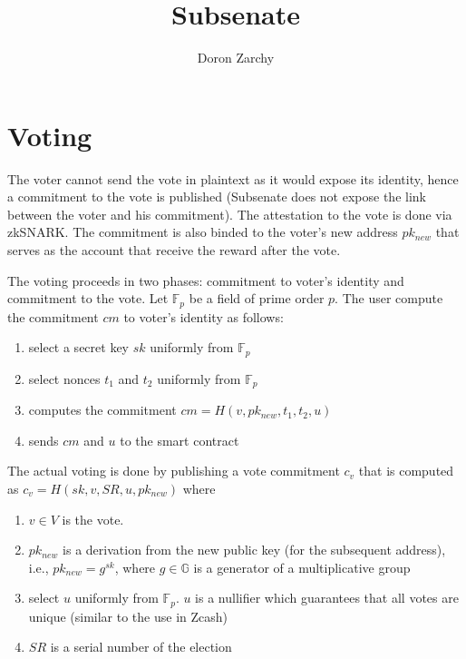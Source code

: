\documentclass[]{paper}
\title{Subsenate}
\author{Doron Zarchy}
\begin{document}
	
	\maketitle 
	
					
					
					
					\section{Voting}
					The voter cannot send the vote in plaintext as it would expose its identity, hence a commitment to the vote is published (Subsenate does not expose the link between the voter and his commitment). The attestation to the vote is done via zkSNARK.   
					The commitment is also binded to the voter's new address $pk_{new}$ that serves as the account that receive the reward after the vote.
					
					The voting proceeds in two phases: commitment to voter's identity and commitment to the vote.
					Let $\mathbb{F}_p$ be a field of prime order $p$. The user compute the commitment $cm$ to voter's identity as follows:
					
					\begin{enumerate}
						\item select a secret key $sk$ uniformly from $\mathbb{F}_p$
						\item select nonces $t_1$ and $t_2$ uniformly from $\mathbb{F}_p$
						\item computes the commitment $cm = H(v,pk_{new},t_1,t_2,u)$
						\item sends $cm$ and $u$ to the smart contract
					\end{enumerate}
					
					The actual voting is done by publishing a vote commitment $c_v$ that is computed as  $c_v= H(sk,v,SR,u,pk_{new})$ where 
					\begin{enumerate}
						\item $v\in V$ is the vote. 
						\item $pk_{new}$ is a derivation from the new public key (for the subsequent address), i.e., $pk_{new} = g^{sk}$, where $g\in \mathbb{G}$ is a generator of a multiplicative group
						\item select $u$ uniformly from  $\mathbb{F}_p$. $u$ is a nullifier which guarantees that all votes are unique (similar to the use in Zcash)
						\item $SR$ is a serial number of the election
					\end{enumerate}
					
\end{document}
